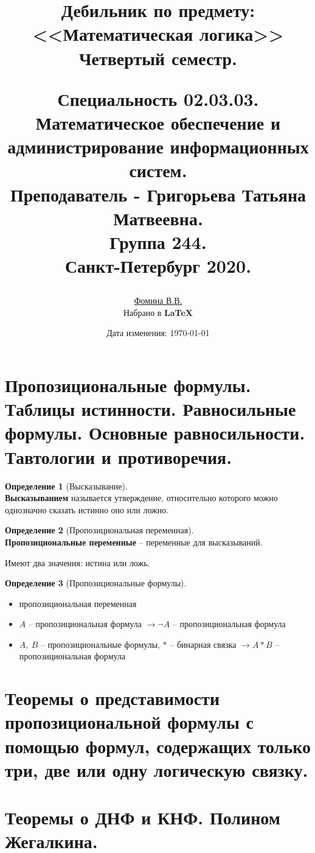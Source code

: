 \documentclass[a4paper,12pt]{article}
\author{
	\href{https://vk.com/victoriaisthebestgirl}{Фомина В.В.}\\ 
	Набрано в {\bf\LaTeX}
}
\title{
	Дебильник по предмету:\\
	 <<Математическая логика>>\\
	Четвертый семестр.
	\begin{center}
		\normalsize
		Специальность 02.03.03.\\
		Математическое обеспечение и администрирование информационных систем.\\
		Преподаватель - Григорьева Татьяна Матвеевна.\\
		Группа 244.\\
		Санкт-Петербург 2020.
	\end{center}
}
\date{Дата изменения: \today\quad\currenttime}
\theoremstyle{definition} %
\newtheorem{definition}{Определение}[section]
\theoremstyle{definition} %
\theoremstyle{remark} %
\begin{document}
	
\maketitle
\newpage

\tableofcontents

\newpage

\section{Пропозициональные формулы. Таблицы истинности. Равносильные формулы. Основные равносильности. Тавтологии и противоречия.}
	\begin{definition}[Высказывание]\ \\[1ex]
		\textbf{Высказыванием} называется утверждение, относительно которого можно однозначно сказать истинно оно или ложно.\\[1ex]
	\end{definition}

	\begin{definition}[Пропозициональная переменная]\ \\[1ex]
		\textbf{Пропозициональные переменные} -- переменные для высказываний.
	\end{definition}
	Имеют два значения: истина или ложь.\\[1ex]

	\begin{definition}[Пропозициональные формулы]\
		\begin{itemize}
			\item пропозициональная переменная
			\item $A$ -- пропозициональная формула $\rightarrow \neg A$ -- пропозициональная формула
			\item $A, \ B$ -- пропозициональные формулы, $*$ -- бинарная связка $\rightarrow A * B$ -- пропозициональная формула
		\end{itemize}
		
	\end{definition}

\section{Теоремы о представимости пропозициональной формулы с помощью формул, содержащих только три, две или одну логическую связку.}

\section{Теоремы о ДНФ и КНФ. Полином Жегалкина.}
\end{document}
